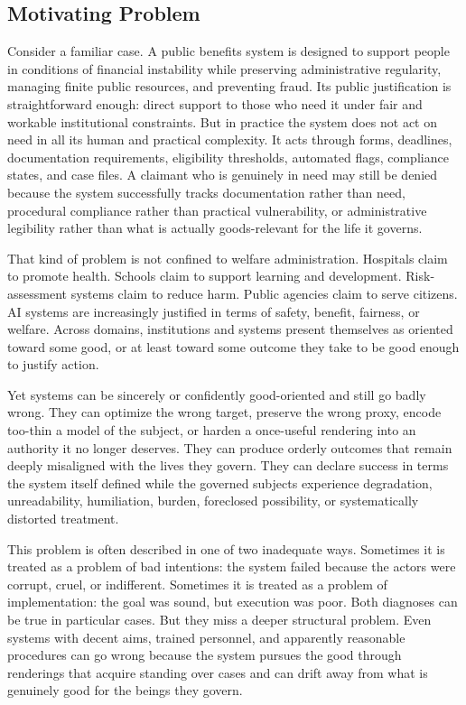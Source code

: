 \documentclass[11pt]{article}
\begin{document}
\subsection{Motivating Problem}

Consider a familiar case. A public benefits system is designed to support people in conditions of financial instability while preserving administrative regularity, managing finite public resources, and preventing fraud. Its public justification is straightforward enough: direct support to those who need it under fair and workable institutional constraints. But in practice the system does not act on need in all its human and practical complexity. It acts through forms, deadlines, documentation requirements, eligibility thresholds, automated flags, compliance states, and case files. A claimant who is genuinely in need may still be denied because the system successfully tracks documentation rather than need, procedural compliance rather than practical vulnerability, or administrative legibility rather than what is actually goods-relevant for the life it governs.\cite{Scott1998SeeingLikeState,MoynihanHerdHarvey2015AdministrativeBurden,Eubanks2018AutomatingInequality}

That kind of problem is not confined to welfare administration. Hospitals claim to promote health. Schools claim to support learning and development. Risk-assessment systems claim to reduce harm. Public agencies claim to serve citizens. AI systems are increasingly justified in terms of safety, benefit, fairness, or welfare. Across domains, institutions and systems present themselves as oriented toward some good, or at least toward some outcome they take to be good enough to justify action.

Yet systems can be sincerely or confidently good-oriented and still go badly wrong. They can optimize the wrong target, preserve the wrong proxy, encode too-thin a model of the subject, or harden a once-useful rendering into an authority it no longer deserves. They can produce orderly outcomes that remain deeply misaligned with the lives they govern. They can declare success in terms the system itself defined while the governed subjects experience degradation, unreadability, humiliation, burden, foreclosed possibility, or systematically distorted treatment.\cite{Campbell1979AssessingImpactPlannedSocialChange,ManheimGarrabrant2019GoodhartsLaw}

This problem is often described in one of two inadequate ways. Sometimes it is treated as a problem of bad intentions: the system failed because the actors were corrupt, cruel, or indifferent. Sometimes it is treated as a problem of implementation: the goal was sound, but execution was poor. Both diagnoses can be true in particular cases. But they miss a deeper structural problem. Even systems with decent aims, trained personnel, and apparently reasonable procedures can go wrong because the system pursues the good through renderings that acquire standing over cases and can drift away from what is genuinely good for the beings they govern.
\end{document}
